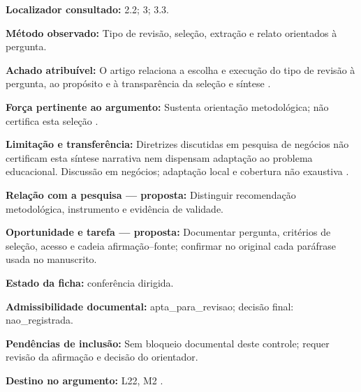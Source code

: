 \noindent\textbf{Localizador consultado:} 2.2; 3; 3.3.\par\medskip

\noindent\textbf{Método observado:} Tipo de revisão, seleção, extração e relato orientados à pergunta.\par\medskip

\noindent\textbf{Achado atribuível:} O artigo relaciona a escolha e execução do tipo de revisão à pergunta, ao propósito e à transparência da seleção e síntese \citep[p. 336–337]{SU11}.\par\medskip

\noindent\textbf{Força pertinente ao argumento:} Sustenta orientação metodológica; não certifica esta seleção \citep[p. 336–337]{SU11}.\par\medskip

\noindent\textbf{Limitação e transferência:} Diretrizes discutidas em pesquisa de negócios não certificam esta síntese narrativa nem dispensam adaptação ao problema educacional. Discussão em negócios; adaptação local e cobertura não exaustiva \citep[p. 336–337]{SU11}.\par\medskip

\noindent\textbf{Relação com a pesquisa — proposta:} Distinguir recomendação metodológica, instrumento e evidência de validade.\par\medskip

\noindent\textbf{Oportunidade e tarefa — proposta:} Documentar pergunta, critérios de seleção, acesso e cadeia afirmação–fonte; confirmar no original cada paráfrase usada no manuscrito.\par\medskip

\noindent\textbf{Estado da ficha:} conferência dirigida.\par\medskip

\noindent\textbf{Admissibilidade documental:} apta\_para\_revisao; decisão final: nao\_registrada.\par\medskip

\noindent\textbf{Pendências de inclusão:} Sem bloqueio documental deste controle; requer revisão da afirmação e decisão do orientador.\par\medskip

\noindent\textbf{Destino no argumento:} L22, M2 .
